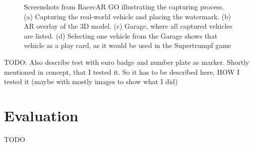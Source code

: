 \begin{figure}[btph]
        \caption[Screenshots from RacecAR GO illustrating the capturing process. (a) Capturing the real-world vehicle and placing the watermark. (b) AR overlay of the 3D model. (c) Garage, where all captured vehicles are listed. (d) Selecting one vehicle from the Garage shows that vehicle as a play card, as it would be used in the Supertrumpf game]{Screenshots from RacecAR GO illustrating the capturing process. (a) Capturing the real-world vehicle and placing the watermark. (b) AR overlay of the 3D model. (c) Garage, where all captured vehicles are listed. (d) Selecting one vehicle from the Garage shows that vehicle as a play card, as it would be used in the Supertrumpf game}
\label{fig:capturingScreenshots}
\end{figure}

TODO: Also describe test with euro badge and number plate as marker. Shortly mentioned in concept, that I tested it. So it has to be described here, HOW I tested it (maybe with mostly images to show what I did)


\chapter{Evaluation}\label{ch:evaluation}
TODO








